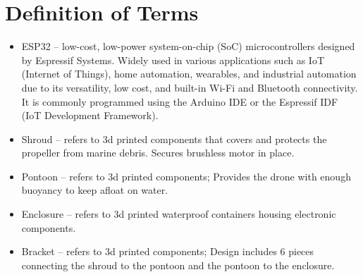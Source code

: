 \section{Definition of Terms}
{\begin{itemize}
  \item ESP32 -- low-cost, low-power system-on-chip (SoC) microcontrollers designed by Espressif Systems. Widely used in various applications such as 
        IoT (Internet of Things), home automation, wearables, and industrial automation due to its versatility, low cost, and built-in Wi-Fi and Bluetooth
        connectivity. It is commonly programmed using the Arduino IDE or the Espressif IDF (IoT Development Framework).
  \item Shroud -- refers to 3d printed components that covers and protects the propeller from marine debris. Secures brushless motor in place.
  \item Pontoon -- refers to 3d printed components; Provides the drone with enough buoyancy to keep afloat on water.
  \item Enclosure -- refers to 3d printed waterproof containers housing electronic components. 
  \item Bracket -- refers to 3d printed components; Design includes 6 pieces connecting the shroud to the pontoon and the pontoon to the enclosure.
\end{itemize}}